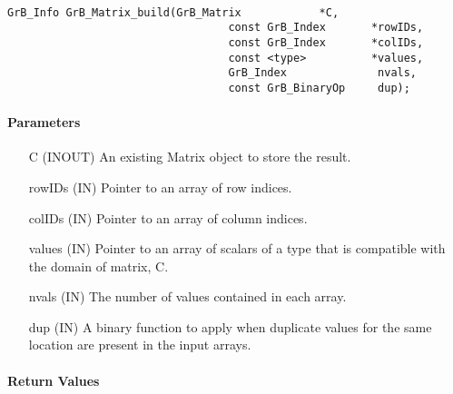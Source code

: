 \paragraph{\syntax}

\begin{Verbatim}[samepage=true]    
        GrB_Info GrB_Matrix_build(GrB_Matrix            *C,
                                  const GrB_Index       *rowIDs,
                                  const GrB_Index       *colIDs, 
                                  const <type>          *values,
                                  GrB_Index              nvals,
                                  const GrB_BinaryOp     dup);
\end{Verbatim}

\paragraph{Parameters}

\begin{itemize}[leftmargin=1.1in]
    \item[{\sf C}]      ({\sf INOUT}) An existing Matrix object to store the result.
    \item[{\sf rowIDs}] ({\sf IN}) Pointer to an array of row indices. 
    \item[{\sf colIDs}] ({\sf IN}) Pointer to an array of column indices. 
    \item[{\sf values}] ({\sf IN}) Pointer to an array of scalars of a type that
                                   is compatible with the domain of matrix, {\sf C}.
    \item[{\sf nvals}]  ({\sf IN}) The number of values contained in each array.
    \item[{\sf dup}]    ({\sf IN}) A binary function to apply when duplicate values 
                        for the same location are present in the input arrays. 
\end{itemize}

\paragraph{Return Values}

